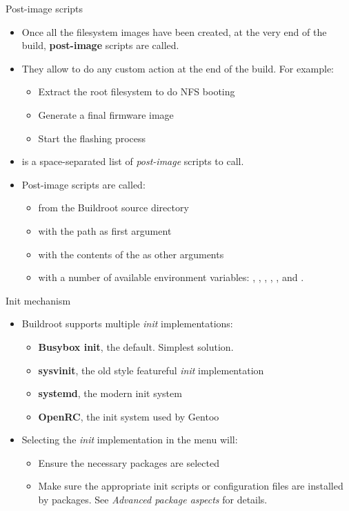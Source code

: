 \begin{frame}{Post-image scripts}
  \begin{itemize}
  \item Once all the filesystem images have been created, at the very
    end of the build, {\bf post-image} scripts are called.
  \item They allow to do any custom action at the end of the
    build. For example:
    \begin{itemize}
    \item Extract the root filesystem to do NFS booting
    \item Generate a final firmware image
    \item Start the flashing process
    \end{itemize}
  \item {} is a space-separated list
    of {\em post-image} scripts to call.
  \item Post-image scripts are called:
    \begin{itemize}
    \item from the Buildroot source directory
    \item with the  path as first argument
    \item with the contents of the  as other arguments
    \item with a number of available environment variables:
      , , ,
      , ,  and
      .
    \end{itemize}
  \end{itemize}
\end{frame}

\begin{frame}{Init mechanism}
  \begin{itemize}
  \item Buildroot supports multiple {\em init} implementations:
    \begin{itemize}
    \item {\bf Busybox init}, the default. Simplest solution.
    \item {\bf sysvinit}, the old style featureful {\em init}
      implementation
    \item {\bf systemd}, the modern init system
    \item {\bf OpenRC}, the init system used by Gentoo
    \end{itemize}
  \item Selecting the {\em init} implementation in the  menu will:
    \begin{itemize}
    \item Ensure the necessary packages are selected
    \item Make sure the appropriate init scripts or configuration
      files are installed by packages. See {\em Advanced package
        aspects} for details.
    \end{itemize}
  \end{itemize}
\end{frame}

